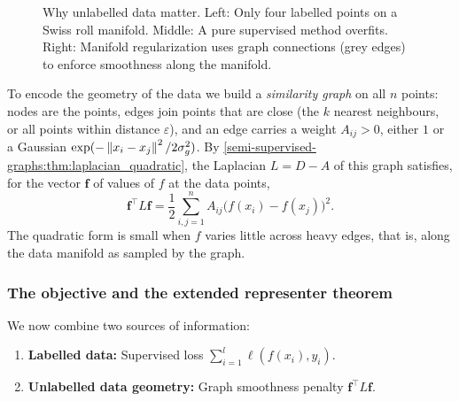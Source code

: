 \begin{notechapter}
\begin{figure}[ht]
\caption{Why unlabelled data matter. Left: Only four labelled
points on a Swiss roll manifold. Middle: A pure supervised
method overfits. Right: Manifold regularization uses graph
connections (grey edges) to enforce smoothness along the manifold.}
\label{semi-supervised-graphs:fig:manifold_motivation}
\end{figure}

To encode the geometry of the data we build a \emph{similarity graph} on all $n$ points: nodes are the points, edges join points that are close (the $k$ nearest neighbours, or all points within distance $\varepsilon$), and an edge carries a weight $A_{ij} > 0$, either $1$ or a Gaussian $\exp(-\left\|x_i - x_j\right\|^2/2\sigma_g^2)$. By \cref{semi-supervised-graphs:thm:laplacian_quadratic}, the Laplacian $L = D - A$ of this graph satisfies, for the vector $\mathbf f$ of values of $f$ at the data points,
\[
\mathbf{f}^\top L \mathbf{f} = \frac{1}{2} \sum_{i,j=1}^n A_{ij}\bigl(f(x_i) - f(x_j)\bigr)^2 .
\]
The quadratic form is small when $f$ varies little across heavy edges, that is, along the data manifold as sampled by the graph.

\subsubsection*{The objective and the extended representer theorem}

We now combine two sources of information:

\begin{enumerate}[label=\emph{(\roman*)}]
  \item \textbf{Labelled data:} Supervised loss $\sum_{i=1}^l \ell(f(x_i), y_i)$.
  \item \textbf{Unlabelled data geometry:} Graph smoothness penalty
    $\mathbf{f}^\top L \mathbf{f}$.
\end{enumerate}


\end{notechapter}
